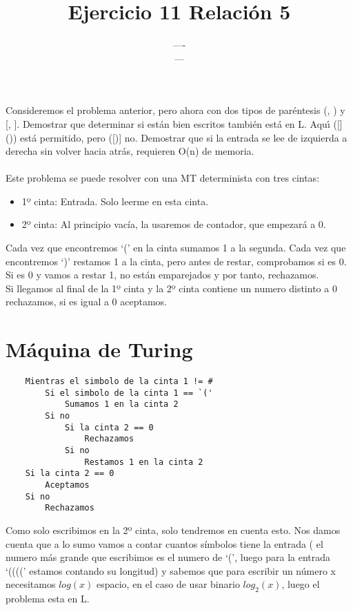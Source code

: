 \documentclass{article}
\title{Ejercicio 11 Relación 5}
\author{---- \\ ---}
\date{}
\begin{document}
\maketitle

Consideremos el problema anterior, pero ahora con dos tipos de paréntesis (, ) y [, ]. Demostrar que determinar si están bien escritos también está en L. Aquı́ ([]()) está permitido, pero ([)] no. Demostrar que si la entrada se lee de izquierda a derecha sin volver hacia atrás, requieren O(n) de memoria.\\
\\
Este problema se puede resolver con una MT determinista con tres cintas:
\begin{itemize}
    \item 1º cinta: Entrada. Solo leerme en esta cinta.
    \item 2º cinta: Al principio vacía, la usaremos de contador, que empezará a 0.
\end{itemize}

Cada vez que encontremos `(' en la cinta sumamos 1 a la segunda. Cada vez que encontremos `)' restamos 1 a la cinta, pero antes de restar, comprobamos si es 0. Si es 0 y vamos a restar 1, no están emparejados y por tanto, rechazamos.\\
Si llegamos al final de la 1º cinta y la 2º cinta contiene un numero distinto a 0 rechazamos, si es igual a 0 aceptamos.

\section{Máquina de Turing}
\begin{lstlisting}
    Mientras el simbolo de la cinta 1 != #
        Si el simbolo de la cinta 1 == `('
            Sumamos 1 en la cinta 2
        Si no
            Si la cinta 2 == 0
                Rechazamos
            Si no
                Restamos 1 en la cinta 2
    Si la cinta 2 == 0
        Aceptamos
    Si no
        Rechazamos
\end{lstlisting}

Como solo escribimos en la 2º cinta, solo tendremos en cuenta esto. Nos damos cuenta que a lo sumo vamos a contar cuantos símbolos tiene la entrada ( el numero más grande que escribimos es el numero de `(', luego para la entrada `((((' estamos contando su longitud) y sabemos que para escribir un número x necesitamos $log(x)$ espacio, en el caso de usar binario $log_{2}(x)$, luego el problema esta en L.
\end{document}
